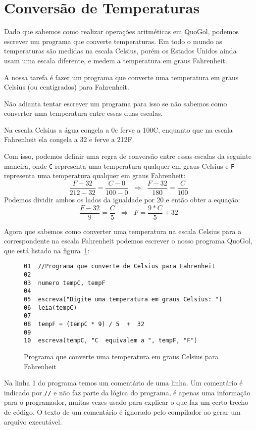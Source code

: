 \documentclass{report}
\newcommand{\Qgol}{QuoGol\;}
\begin{document}


\section{Conversão de Temperaturas}

Dado que sabemos como realizar operações aritméticas em \Qgol,
podemos escrever um programa que converte temperaturas. Em todo o
mundo as temperaturas são medidas na escala Celsius, porém os
Estados Unidos ainda usam uma escala diferente, e medem a temperatura
em graus Fahrenheit. 

A nossa tarefa é fazer um programa que converte uma temperatura em
graus Celsius (ou centígrados) para Fahrenheit.

Não adianta tentar escrever um programa para isso se não sabemos
como converter uma temperatura entre essas duas escalas.

Na escala Celsius a água congela a 0\degree e ferve a 100\degree C,
enquanto que na escala Fahrenheit ela congela a 32\degree
e ferve a 212\degree F.

Com isso, podemos definir uma regra de conversão entre essas escalas
da seguinte maneira, onde \texttt{C} representa uma temperatura qualquer
em graus Celsius e \texttt{F} representa uma temperatura qualquer em
graus Fahrenheit:
\[
\frac{F-32}{212-32} = \frac{C-0}{100-0}  \;\;\Rightarrow\;\;  \frac{F-32}{180}  =  \frac{C}{100}
\]
Podemos dividir ambos os lados da igualdade por 20 e então obter a equação:
\[
\frac{F-32}{9} = \frac{C}{5}  \;\;\Rightarrow\;\;  F = \frac{9*C}{5} + 32
\]

Agora que sabemos como converter uma temperatura na escala Celsius para a
correspondente na escala Fahrenheit podemos escrever o nosso programa \Qgol,
que está listado na figura~\ref{fig:celsius}:

\begin{figure}
\begin{verbatim}
01  //Programa que converte de Celsius para Fahrenheit
02
03  numero tempC, tempF
04
05  escreva("Digite uma temperatura em graus Celsius: ")
06  leia(tempC)
07
08  tempF = (tempC * 9) / 5  +  32
09
10  escreva(tempC, "C  equivalem a ", tempF, "F")
\end{verbatim}
\caption{Programa que converte uma temperatura em graus Celsius para Fahrenheit}
\label{fig:celsius}
\end{figure}

Na linha 1 do programa temos um comentário de uma linha. Um comentário é indicado
por \texttt{//} e não faz parte da lógica do programa, é apenas uma informação para
o programador, muitas vezes usado para explicar o que faz um certo trecho de código.
O texto de um comentário é ignorado pelo compilador ao gerar um arquivo executável.
\end{document}
